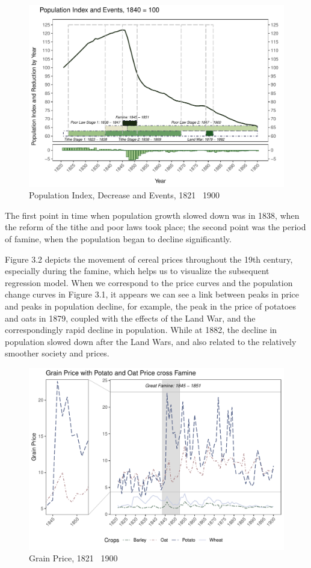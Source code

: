 \begin{figure}[h]
    \centering
    \caption{Population Index, Decrease and Events, 1821 \textendash\ 1900}
    \includegraphics[width=.95\textwidth]{../03_outputs/popline.pdf}
\end{figure}

The first point in time when population growth slowed down was in 1838, when the reform of the tithe and poor laws took place; the second point was the period of famine, when the population began to decline significantly.

Figure 3.2 depicts the movement of cereal prices throughout the 19th century, especially during the famine, which helps us to visualize the subsequent regression model. When we correspond to the price curves and the population change curves in Figure 3.1, it appears we can see a link between peaks in price and peaks in population decline, for example, the peak in the price of potatoes and oats in 1879, coupled with the effects of the Land War, and the correspondingly rapid decline in population. While at 1882, the decline in population slowed down after the Land Wars, and also related to the relatively smoother society and prices.

\begin{figure}[h]
    \centering
    \caption{Grain Price, 1821 \textendash\ 1900}
    \includegraphics[width=.95\textwidth]{../03_outputs/grain_price.pdf}
\end{figure}

